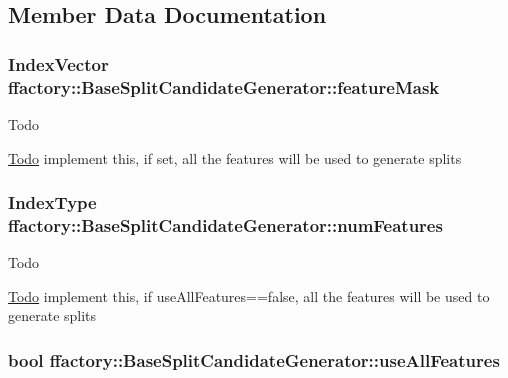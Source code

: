\subsection{Member Data Documentation}
\hypertarget{classffactory_1_1_base_split_candidate_generator_a7ce11df8208d85d2da2914e41ab3467c}{
\subsubsection[{feature\-Mask}]{\setlength{\rightskip}{0pt plus 5cm}Index\-Vector ffactory\-::\-Base\-Split\-Candidate\-Generator\-::feature\-Mask\hspace{0.3cm}{\ttfamily [protected]}}}\label{classffactory_1_1_base_split_candidate_generator_a7ce11df8208d85d2da2914e41ab3467c}
\begin{DoxyRefDesc}{Todo}
\item[\hyperlink{todo__todo000006}{Todo}]implement this, if set, all the features will be used to generate splits \end{DoxyRefDesc}
\hypertarget{classffactory_1_1_base_split_candidate_generator_a418bcf78922a3d288de0ae3ec55553a6}{
\subsubsection[{num\-Features}]{\setlength{\rightskip}{0pt plus 5cm}Index\-Type ffactory\-::\-Base\-Split\-Candidate\-Generator\-::num\-Features\hspace{0.3cm}{\ttfamily [protected]}}}\label{classffactory_1_1_base_split_candidate_generator_a418bcf78922a3d288de0ae3ec55553a6}
\begin{DoxyRefDesc}{Todo}
\item[\hyperlink{todo__todo000007}{Todo}]implement this, if use\-All\-Features==false, all the features will be used to generate splits \end{DoxyRefDesc}
\hypertarget{classffactory_1_1_base_split_candidate_generator_afe4971fb46570d6658dad28eefe6d52c}{
\subsubsection[{use\-All\-Features}]{\setlength{\rightskip}{0pt plus 5cm}bool ffactory\-::\-Base\-Split\-Candidate\-Generator\-::use\-All\-Features\hspace{0.3cm}{\ttfamily [protected]}}}\label{classffactory_1_1_base_split_candidate_generator_afe4971fb46570d6658dad28eefe6d52c}
